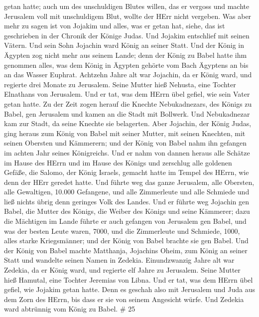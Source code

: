 getan hatte;  auch um des unschuldigen Blutes willen, das er
vergoss und machte Jerusalem voll mit unschuldigem Blut, wollte der HErr
nicht vergeben.  Was aber mehr zu sagen ist von Jojakim und
alles, was er getan hat, siehe, das ist geschrieben in der Chronik der
Könige Judas.  Und Jojakim entschlief mit seinen Vätern. Und
sein Sohn Jojachin ward König an seiner Statt.  Und der
König in Ägypten zog nicht mehr aus seinem Lande; denn der König zu
Babel hatte ihm genommen alles, was dem König in Ägypten gehörte vom
Bach Ägyptens an bis an das Wasser Euphrat.  Achtzehn Jahre
alt war Jojachin, da er König ward, und regierte drei Monate zu
Jerusalem. Seine Mutter hieß Nehusta, eine Tochter Elnathans von
Jerusalem.  Und er tat, was dem HErrn übel gefiel, wie sein
Vater getan hatte.  Zu der Zeit zogen herauf die Knechte
Nebukadnezars, des Königs zu Babel, gen Jerusalem und kamen an die Stadt
mit Bollwerk.  Und Nebukadnezar kam zur Stadt, da seine
Knechte sie belagerten.  Aber Jojachin, der König Judas,
ging heraus zum König von Babel mit seiner Mutter, mit seinen Knechten,
mit seinen Obersten und Kämmerern; und der König von Babel nahm ihn
gefangen im achten Jahr seines Königreichs.  Und er nahm
von dannen heraus alle Schätze im Hause des HErrn und im Hause des
Königs und zerschlug alle goldenen Gefäße, die Salomo, der König
Israels, gemacht hatte im Tempel des HErrn, wie denn der HErr geredet
hatte.  Und führte weg das ganze Jerusalem, alle Obersten,
alle Gewaltigen, 10.000 Gefangene, und alle Zimmerleute und alle
Schmiede und ließ nichts übrig denn geringes Volk des Landes.
 Und er führte weg Jojachin gen Babel, die Mutter des
Königs, die Weiber des Königs und seine Kämmerer; dazu die Mächtigen im
Lande führte er auch gefangen von Jerusalem gen Babel,  und
was der besten Leute waren, 7000, und die Zimmerleute und Schmiede,
1000, alles starke Kriegsmänner; und der König von Babel brachte sie gen
Babel.  Und der König von Babel machte Matthanja, Jojachins
Oheim, zum König an seiner Statt und wandelte seinen Namen in Zedekia.
 Einundzwanzig Jahre alt war Zedekia, da er König ward, und
regierte elf Jahre zu Jerusalem. Seine Mutter hieß Hamutal, eine Tochter
Jeremias von Libna.  Und er tat, was dem HErrn übel gefiel,
wie Jojakim getan hatte.  Denn es geschah also mit
Jerusalem und Juda aus dem Zorn des HErrn, bis dass er sie von seinem
Angesicht würfe. Und Zedekia ward abtrünnig vom König zu Babel. \# 25
